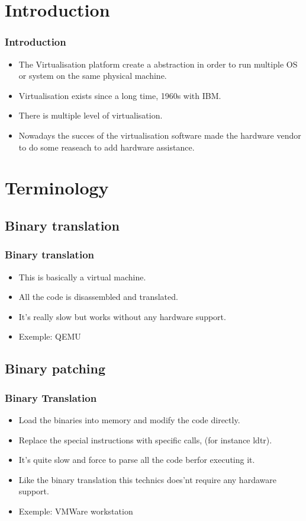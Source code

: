 

\section{Introduction}
\begin{frame}
\frametitle{Introduction}
\begin{itemize}
\item The Virtualisation platform create a abstraction
in order to run multiple OS or system on the same physical machine.
\item Virtualisation exists since a long time, 1960s with IBM.
\item There is multiple level of virtualisation.
\item Nowadays the succes of the virtualisation software made the
hardware vendor to do some reaseach to add hardware assistance.
\end{itemize}
\end{frame}

\section{Terminology}
\subsection{Binary translation}
\begin{frame}
\frametitle{Binary translation}
\begin{itemize}
\item This is basically a virtual machine.
\item All the code is disassembled and translated.
\item It's really slow but works without any hardware support.
\item Exemple: QEMU
\end{itemize}
\end{frame}

\subsection{Binary patching}
\begin{frame}
\frametitle{Binary Translation}
\begin{itemize}
  \item Load the binaries into memory and modify the code directly.
  \item Replace the special instructions with specific calls, (for
  instance ldtr).
  \item It's quite slow and force to parse all the code berfor executing
  it.
  \item Like the binary translation this technics does'nt require any
  hardaware support.
  \item Exemple: VMWare workstation
\end{itemize}
\end{frame}

